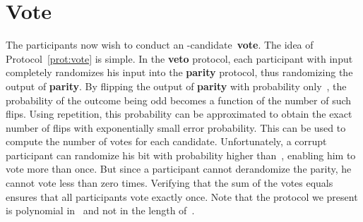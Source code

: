 \documentclass[11pt]{article}
\begin{document}
\section{Vote}
\label{sec:vote}



The participants now wish to conduct an -candidate~\textbf{vote}.
The idea of Protocol~\ref{prot:vote} is simple. In the \textbf{veto}
protocol, each participant with input~ completely randomizes his
input into the \textbf{parity} protocol, thus randomizing the output
of \textbf{parity}. By flipping the output of \textbf{parity}
 with probability only~, the
probability of the outcome being odd becomes a function of the
number of such flips. Using repetition, this probability can be
approximated to obtain the exact number of flips with exponentially
small error probability. This can be used to compute the number of
votes for each candidate. Unfortunately, a corrupt participant can
randomize his bit with probability higher than~, enabling him
to vote more than once. But  since a participant cannot derandomize
the parity, he cannot vote less than zero times. Verifying that the
sum of the  votes equals~ ensures that all participants vote
exactly once. Note that the protocol we present is polynomial in~
and not in the length of~.
\end{document}
